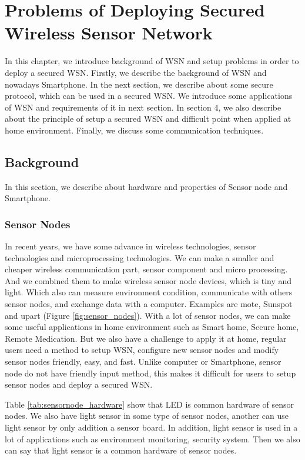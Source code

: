 \chapter{Problems of Deploying Secured Wireless Sensor Network }\label{chap:bg}
In this chapter, we introduce background of WSN and setup problems in order to deploy a secured WSN. Firstly, we describe the background of WSN and nowadays Smartphone. In the next section, we describe about some secure protocol, which can be used in a secured WSN. We introduce some applications of WSN and requirements of it in next section. In section 4, we also describe about the principle of setup a secured WSN and difficult point when applied at home environment. Finally, we discuss some communication techniques.
\clearpage
\section{Background}\label{sec:bg_bg}%
In this section, we describe about hardware and properties of Sensor node and Smartphone.

\subsection{Sensor Nodes}

In recent years, we have some advance in wireless technologies, sensor technologies and microprocessing technologies. We can make a smaller and cheaper wireless communication part, sensor component and micro processing. And we combined them to make wireless sensor node devices, which is tiny and light. Which also can measure environment condition, communicate with others sensor nodes, and exchange data with a computer. Examples are mote\cite{mote_sensor_node}, Sunspot\cite{sunspot_sensor_node} and upart\cite{upart_sensor_node} (Figure \ref{fig:sensor_nodes}). With a lot of sensor nodes, we can make some useful applications in home environment such as Smart home, Secure home, Remote Medication. But we also have a challenge to apply it at home, regular users need a method to setup WSN, configure new sensor nodes and modify sensor nodes friendly, easy, and fast. Unlike computer or Smartphone, sensor node do not have friendly input method, this makes it difficult for users to setup sensor nodes and deploy a secured WSN.

Table \ref{tab:sensornode_hardware} show that LED is common hardware of sensor nodes. We also have light sensor in some type of sensor nodes, another can use light sensor by only addition a sensor board. In addition, light sensor is used in a lot of applications such as environment monitoring, security system. Then we also can say that light sensor is a common hardware of sensor nodes.

